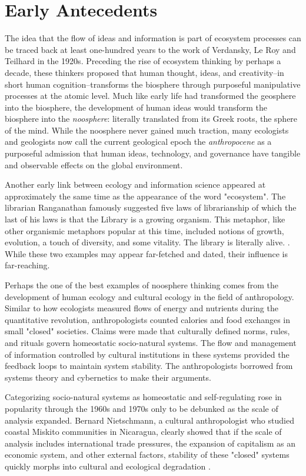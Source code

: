 \section{Early Antecedents}

The idea that the flow of ideas and information is part of ecosystem processes can be traced back at least one-hundred years to the work of Verdansky, Le Roy and Teilhard in the 1920s. Preceding the rise of ecosystem thinking by perhaps a decade, these thinkers proposed that human thought, ideas, and creativity--in short human cognition--transforms the biosphere through purposeful manipulative processes at the atomic level. Much like early life had transformed the geosphere into the biosphere, the development of human ideas would transform the biosphere into the \textit{noosphere}: literally translated from its Greek roots, the sphere of the mind. While the noosphere never gained much traction, many ecologists and geologists now call the current geological epoch the \textit{anthropocene} as a purposeful admission that human ideas, technology, and governance have tangible and observable effects on the global environment. 

Another early link between ecology and information science appeared at approximately the same time as the appearance of the word "ecosystem". The librarian Ranganathan famously suggested five laws of librarianship of which the last of his laws is that the Library is a growing organism. This metaphor, like other organismic metaphors popular at this time, included notions of growth, evolution, a touch of diversity, and some vitality. The library is literally alive. \citep{ranganathan_1931}. While these two examples may appear far-fetched and dated, their influence is far-reaching. 

Perhaps the one of the best examples of noosphere thinking comes from the development of human ecology and cultural ecology in the field of anthropology. Similar to how ecologists measured flows of energy and nutrients during the quantitative revolution, anthropologists counted calories and food exchanges in small "closed" societies. Claims were made that culturally defined norms, rules, and rituals govern homeostatic socio-natural systems. The flow and management of information controlled by cultural institutions in these systems provided the feedback loops to maintain system stability. The anthropologists borrowed from systems theory and cybernetics to make their arguments. 

Categorizing socio-natural systems as homeostatic and self-regulating rose in popularity through the 1960s and 1970s only to be debunked as the scale of analysis expanded. Bernard Nietschmann, a cultural anthropologist who studied coastal Miskito communities in Nicaragua, clearly showed that if the scale of analysis includes international trade pressures, the expansion of capitalism as an economic system, and other external factors, stability of these "closed" systems quickly morphs into cultural and ecological degradation \citep{nietschmannn_1973}.

